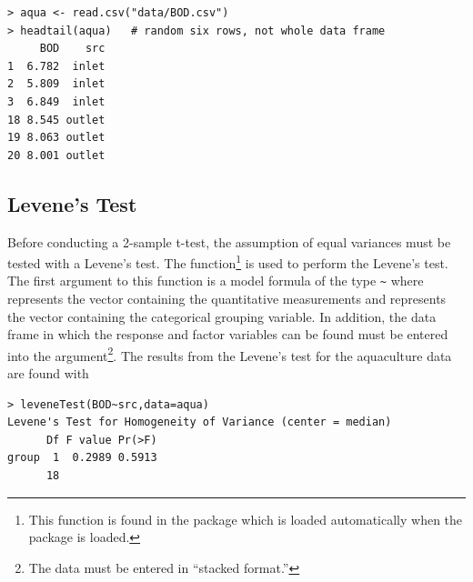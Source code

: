 \documentclass[10pt,openany]{book}\usepackage[]{graphicx}\usepackage[]{color}
\makeatletter
\newenvironment{kframe}{%
 \def\at@end@of@kframe{}%
 \ifinner\ifhmode%
  \def\at@end@of@kframe{\end{minipage}}%
  \begin{minipage}{\columnwidth}%
 \fi\fi%
 \def\FrameCommand##1{\hskip\@totalleftmargin \hskip-\fboxsep
 \colorbox{shadecolor}{##1}\hskip-\fboxsep
     \hskip-\linewidth \hskip-\@totalleftmargin \hskip\columnwidth}%
 \MakeFramed {\advance\hsize-\width
   \@totalleftmargin\z@ \linewidth\hsize
   \@setminipage}}%
 {\par\unskip\endMakeFramed%
 \at@end@of@kframe}
\newenvironment{knitrout}{}{} %
\makeatother
\begin{document}
\begin{knitrout}
\color{fgcolor}\begin{kframe}
\begin{verbatim}
> aqua <- read.csv("data/BOD.csv")
> headtail(aqua)   # random six rows, not whole data frame
     BOD    src
1  6.782  inlet
2  5.809  inlet
3  6.849  inlet
18 8.545 outlet
19 8.063 outlet
20 8.001 outlet
\end{verbatim}
\end{kframe}
\end{knitrout}


\vspace{-12pt}

\subsection{Levene's Test}
Before conducting a 2-sample t-test, the assumption of equal variances must be tested with a Levene's test.  The  function\footnote{This function is found in the  package which is loaded automatically when the  package is loaded.} is used to perform the Levene's test.  The first argument to this function is a model formula of the type \verb"~" where  represents the vector containing the quantitative measurements and  represents the vector containing the categorical grouping variable.  In addition, the data frame in which the response and factor variables can be found must be entered into the  argument\footnote{The data must be entered in ``stacked format.''}.  The results from the Levene's test for the aquaculture data are found with

\begin{knitrout}
\color{fgcolor}\begin{kframe}
\begin{verbatim}
> leveneTest(BOD~src,data=aqua)
Levene's Test for Homogeneity of Variance (center = median)
      Df F value Pr(>F)
group  1  0.2989 0.5913
      18               
\end{verbatim}
\end{kframe}
\end{knitrout}
\end{document}
